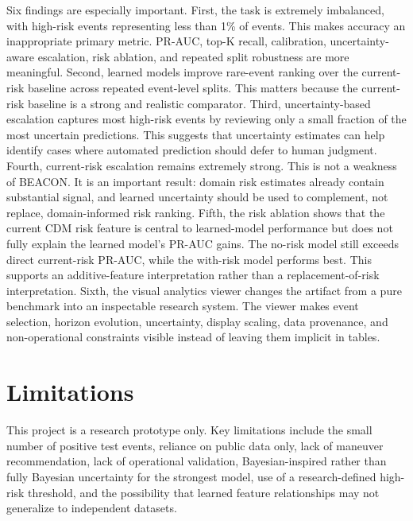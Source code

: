 \documentclass[11pt]{article}
\begin{document}
Six findings are especially important. First, the task is extremely imbalanced, with high-risk events representing less than 1\% of events. This makes accuracy an inappropriate primary metric. PR-AUC, top-K recall, calibration, uncertainty-aware escalation, risk ablation, and repeated split robustness are more meaningful. Second, learned models improve rare-event ranking over the current-risk baseline across repeated event-level splits. This matters because the current-risk baseline is a strong and realistic comparator. Third, uncertainty-based escalation captures most high-risk events by reviewing only a small fraction of the most uncertain predictions. This suggests that uncertainty estimates can help identify cases where automated prediction should defer to human judgment. Fourth, current-risk escalation remains extremely strong. This is not a weakness of BEACON. It is an important result: domain risk estimates already contain substantial signal, and learned uncertainty should be used to complement, not replace, domain-informed risk ranking. Fifth, the risk ablation shows that the current CDM risk feature is central to learned-model performance but does not fully explain the learned model's PR-AUC gains. The no-risk model still exceeds direct current-risk PR-AUC, while the with-risk model performs best. This supports an additive-feature interpretation rather than a replacement-of-risk interpretation. Sixth, the visual analytics viewer changes the artifact from a pure benchmark into an inspectable research system. The viewer makes event selection, horizon evolution, uncertainty, display scaling, data provenance, and non-operational constraints visible instead of leaving them implicit in tables.

\section{Limitations}

This project is a research prototype only. Key limitations include the small number of positive test events, reliance on public data only, lack of maneuver recommendation, lack of operational validation, Bayesian-inspired rather than fully Bayesian uncertainty for the strongest model, use of a research-defined high-risk threshold, and the possibility that learned feature relationships may not generalize to independent datasets.
\end{document}
